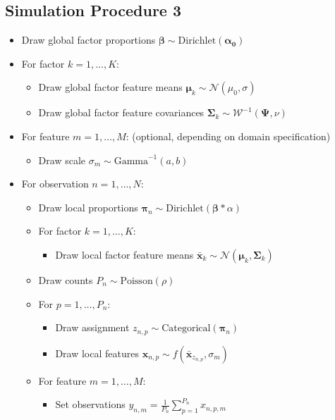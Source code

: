 \documentclass[twoside,11pt]{article}
\begin{document}
\subsection{Simulation Procedure 3}
\label{app:sim3}
\begin{itemize}
    \item Draw global factor proportions $\boldsymbol{\beta} \sim \mbox{Dirichlet}(\boldsymbol{\alpha_0})$
    \item For factor $k=1,\dots,K$:
    \begin{itemize}
        \item Draw global factor feature means $\boldsymbol{\mu}_k \sim \mathcal{N}(\mu_0, \sigma)$
        \item Draw global factor feature covariances $\boldsymbol{\Sigma}_k \sim \mathcal{W}^{-1}(\boldsymbol{\Psi}, \nu)$
    \end{itemize}
    \item For feature $m=1,\dots,M$: (optional, depending on domain specification)
    \begin{itemize}
        \item Draw scale $\sigma_m \sim \mbox{Gamma}^{-1}(a, b)$
    \end{itemize}
    \item For observation $n=1,\dots,N$:
    \begin{itemize}
        \item Draw local proportions $\boldsymbol{\pi}_n \sim \mbox{Dirichlet}( \boldsymbol{\beta}*\alpha)$
        \item For factor $k=1,\dots,K$:
        \begin{itemize}
            \item Draw local factor feature means $\boldsymbol{\bar{x}}_k \sim \mathcal{N}(\boldsymbol{\mu}_k, \boldsymbol{\Sigma}_k)$
        \end{itemize}
        \item Draw counts $P_n \sim \mbox{Poisson}(\rho)$
        \item For $p=1,\dots,P_n$:
        \begin{itemize}
            \item Draw assignment $z_{n,p} \sim \mbox{Categorical}(\boldsymbol{\pi}_n)$
            \item Draw local features $\boldsymbol{x}_{n,p} \sim f(\boldsymbol{\bar{x}}_{z_{n,p}}, \sigma_m)$
        \end{itemize}
        \item For feature $m=1,\dots,M$:
        \begin{itemize}
            \item Set observations $y_{n,m} = \frac{1}{P_n}\sum_{p=1}^{P_n} x_{n,p,m}$ 
        \end{itemize}
    \end{itemize}
\end{itemize}
\end{document}

